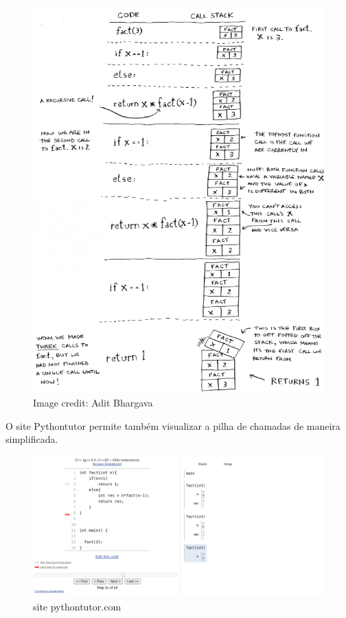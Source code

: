 \begin{figure}[htbp]
\centering
\includegraphics[scale=0.4]{images/callstack.png}
\caption{Image credit: Adit Bhargava} 
\end{figure}

\newpage 


O site Pythontutor permite também visualizar a pilha de chamadas de maneira simplificada.

\begin{figure}[htbp]
\centering
\includegraphics[scale=0.5]{images/pythontutor.png}
\caption{site pythontutor.com}
\end{figure}



